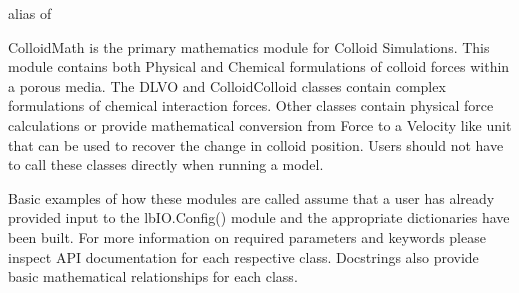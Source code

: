 \documentclass[letterpaper,10pt,english]{sphinxmanual}
\begin{document}
\begin{fulllineitems}
\label{\detokenize{index:lb_colloids.ColloidMath}}
alias of {\hyperref[\detokenize{index:module-lb_colloids.Colloids.Colloid_Math}]{}}

\end{fulllineitems}

\label{\detokenize{index:module-lb_colloids.Colloids.Colloid_Math}}
ColloidMath is the primary mathematics module for Colloid Simulations.
This module contains both Physical and Chemical formulations of colloid forces within a
porous media. The DLVO and ColloidColloid classes contain complex formulations
of chemical interaction forces. Other classes contain physical force calculations or
provide mathematical conversion from Force to a Velocity like unit that can be used
to recover the change in colloid position. Users should not have to call these classes
directly when running a model.

Basic examples of how these modules are called assume that a user has already provided input to
the lbIO.Config() module and the appropriate dictionaries have been built. For more information
on required parameters and keywords please inspect API documentation for each respective class.
Docstrings also provide basic mathematical relationships for each class.
\end{document}
